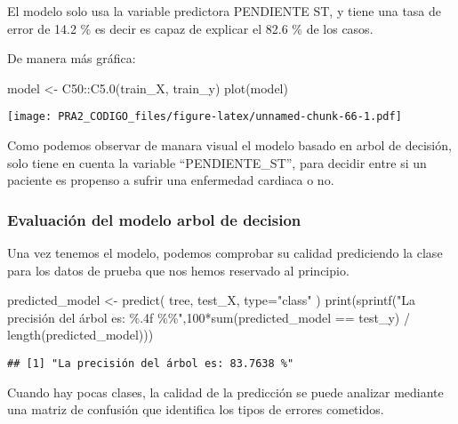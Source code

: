 \documentclass[
]{article}
\newenvironment{Shaded}{\begin{snugshade}}{\end{snugshade}}
\newcommand{\AttributeTok}[1]{\textcolor[rgb]{0.80,0.80,0.80}{#1}}
\newcommand{\DecValTok}[1]{\textcolor[rgb]{0.86,0.86,0.80}{#1}}
\newcommand{\FunctionTok}[1]{\textcolor[rgb]{0.94,0.94,0.56}{#1}}
\newcommand{\NormalTok}[1]{\textcolor[rgb]{0.80,0.80,0.80}{#1}}
\newcommand{\OtherTok}[1]{\textcolor[rgb]{0.94,0.94,0.56}{#1}}
\newcommand{\SpecialCharTok}[1]{\textcolor[rgb]{0.86,0.64,0.64}{#1}}
\newcommand{\StringTok}[1]{\textcolor[rgb]{0.80,0.58,0.58}{#1}}
\begin{document}
El modelo solo usa la variable predictora PENDIENTE ST, y tiene una tasa
de error de 14.2 \% es decir es capaz de explicar el 82.6 \% de los
casos.

De manera más gráfica:

\begin{Shaded}
\begin{Highlighting}[]
\NormalTok{model }\OtherTok{\textless{}{-}}\NormalTok{ C50}\SpecialCharTok{::}\FunctionTok{C5.0}\NormalTok{(train\_X, train\_y)}
\FunctionTok{plot}\NormalTok{(model)}
\end{Highlighting}
\end{Shaded}

\texttt{[image: PRA2\_CODIGO\_files/figure-latex/unnamed-chunk-66-1.pdf]}

Como podemos observar de manara visual el modelo basado en arbol de
decisión, solo tiene en cuenta la variable ``PENDIENTE\_ST'', para
decidir entre si un paciente es propenso a sufrir una enfermedad
cardiaca o no.

\hypertarget{evaluaciuxf3n-del-modelo-arbol-de-decision}{%
\subsubsection{Evaluación del modelo arbol de
decision}\label{evaluaciuxf3n-del-modelo-arbol-de-decision}}

Una vez tenemos el modelo, podemos comprobar su calidad prediciendo la
clase para los datos de prueba que nos hemos reservado al principio.

\begin{Shaded}
\begin{Highlighting}[]
\NormalTok{predicted\_model }\OtherTok{\textless{}{-}} \FunctionTok{predict}\NormalTok{( tree, test\_X, }\AttributeTok{type=}\StringTok{"class"}\NormalTok{ )}
\FunctionTok{print}\NormalTok{(}\FunctionTok{sprintf}\NormalTok{(}\StringTok{"La precisión del árbol es: \%.4f \%\%"}\NormalTok{,}\DecValTok{100}\SpecialCharTok{*}\FunctionTok{sum}\NormalTok{(predicted\_model }\SpecialCharTok{==}\NormalTok{ test\_y) }\SpecialCharTok{/} \FunctionTok{length}\NormalTok{(predicted\_model)))}
\end{Highlighting}
\end{Shaded}

\begin{verbatim}
## [1] "La precisión del árbol es: 83.7638 %"
\end{verbatim}

Cuando hay pocas clases, la calidad de la predicción se puede analizar
mediante una matriz de confusión que identifica los tipos de errores
cometidos.
\end{document}
